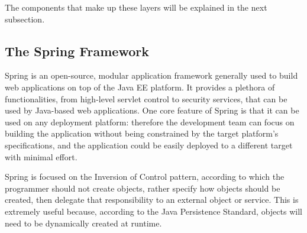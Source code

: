 \documentclass[12pt]{article}
\begin{document}
The components that make up these layers will be explained in the next subsection.

\subsection{The Spring Framework}
\label{Spring}
Spring is an open-source, modular application framework generally used to build web applications on top of the Java EE platform. It provides a plethora of functionalities, from high-level servlet control to security services, that can be used by Java-based web applications. One core feature of Spring is that it can be used on any deployment platform: therefore the development team can focus on building the application without being constrained by the target platform's specifications, and the application could be easily deployed to a different target with minimal effort.

Spring is focused on the Inversion of Control pattern, according to which the programmer should not create objects, rather specify how objects should be created, then delegate that responsibility to an external object or service. This is extremely useful because, according to the Java Persistence Standard, objects will need to be dynamically created at runtime.
\end{document}
